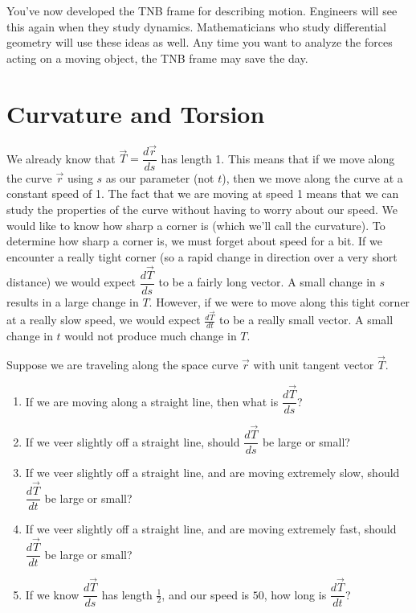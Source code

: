 You've now developed the TNB frame for describing motion. Engineers will see this again when they study dynamics. Mathematicians who study differential geometry will use these ideas as well. Any time you want to analyze the forces acting on a moving object, the TNB frame may save the day.

 
\section{Curvature and Torsion}

We already know that $\vec T=\dfrac{d\vec r}{ds}$ has length 1. This means that if we move along the curve $\vec r$ using $s$ as our parameter (not $t$), then we move along the curve at a constant speed of 1. The fact that we are moving at speed 1 means that we can study the properties of the curve without having to worry about our speed. We would like to know how sharp a corner is (which we'll call the curvature). To determine how sharp a corner is, we must forget about speed for a bit. If we encounter a really tight corner (so a rapid change in direction over a very short distance) we would expect $\dfrac{d\vec T}{ds}$ to be a fairly long vector. A small change in $s$ results in a large change in $T$. However, if we were to move along this tight corner at a really slow speed, we would expect $\frac{d\vec T}{dt}$ to be a really small vector. A small change in $t$ would not produce much change in $T$. 

\begin{problem}
Suppose we are traveling along the space curve $\vec r$ with unit tangent vector $\vec T$. 
\begin{enumerate}
 \item If we are moving along a straight line, then what is $\dfrac{d\vec T}{ds}$?
 \item If we veer slightly off a straight line, should $\dfrac{d\vec T}{ds}$ be large or small?
 \item If we veer slightly off a straight line, and are moving extremely slow, should $\dfrac{d\vec T}{dt}$ be large or small?
 \item If we veer slightly off a straight line, and are moving extremely fast, should $\dfrac{d\vec T}{dt}$ be large or small?
 \item If we know $\dfrac{d\vec T}{ds}$ has length $\frac{1}{2}$, and our speed is $50$, how long is $\dfrac{d\vec T}{dt}$?
\end{enumerate}
\end{problem}

